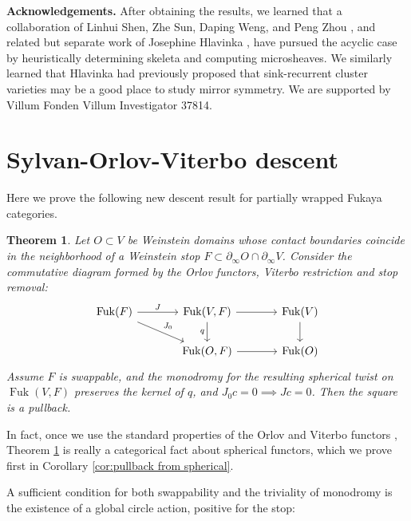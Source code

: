 \documentclass[12pt, letter]{amsart}
\DeclareMathOperator{\Fuk}{Fuk}
\newtheorem{theorem}[dummy]{Theorem}
\theoremstyle{definition}
\begin{document}
{\bf Acknowledgements.} 
After obtaining the results, we learned that a collaboration of Linhui Shen, Zhe Sun, Daping Weng, and Peng Zhou \cite{SSWZ}, and related but separate work of Josephine Hlavinka \cite{Hlavinka-mirror}, have pursued the acyclic case by heuristically determining  skeleta and computing microsheaves.    We similarly learned that  Hlavinka had previously  proposed that sink-recurrent cluster varieties may be a good place to study mirror symmetry.
We are supported by Villum Fonden Villum Investigator 37814.  

\section{Sylvan-Orlov-Viterbo descent}

Here we prove the following new descent result for partially wrapped Fukaya categories. 


\begin{theorem}\label{thm: SOV descent}
Let $O\subset V$ be Weinstein domains 
whose contact boundaries coincide in 
the neighborhood of a Weinstein stop $F \subset \partial_\infty O \cap \partial_\infty V$.  Consider the commutative diagram formed by the Orlov functors, Viterbo restriction and stop removal: 
\begin{equation}\label{eq:s4-viterbo-pullback}
 \begin{tikzcd}[column sep=large]
 \Fuk(F) \arrow[r, "J"] \arrow [dr, "J_0"]
 & \Fuk(V,F)\arrow[r]\arrow[d,"q"']
   &\Fuk(V)\arrow[d]\\ & 
 \Fuk(O,F)\arrow[r]&\Fuk(O)
 \end{tikzcd}
\end{equation}
Assume $F$ is swappable, and the monodromy for the resulting spherical twist on $\Fuk(V, F)$ preserves the kernel of $q$, and
$J_0 c =0 \implies J c = 0$.  Then the square
is a pullback. 
\end{theorem}

In fact, once we use the standard properties of the Orlov and Viterbo functors \cite{GPS2, Sy}, Theorem \ref{thm: SOV descent} is really a categorical fact about spherical functors, which we prove first in Corollary \ref{cor:pullback from spherical}.  


A sufficient condition for both swappability and the triviality of monodromy is the existence of a global circle action, positive for the stop: 
\end{document}
